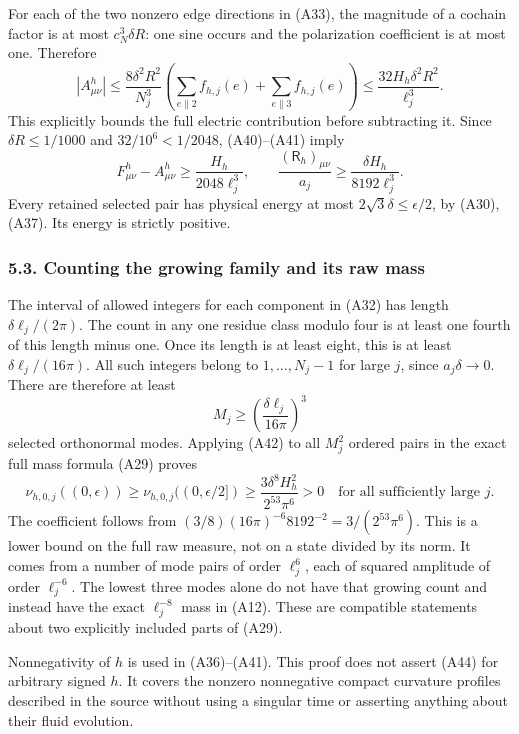 \documentclass[
  11pt,
]{article}
\begin{document}
For each of the two nonzero edge directions in (A33), the magnitude of a
cochain factor is at most \(c_N^3\delta R\): one sine occurs and the
polarization coefficient is at most one. Therefore \[
 |A^h_{\mu\nu}|
 \le\frac{8\delta^2R^2}{N_j^3}
          \left(\sum_{e\parallel2}f_{h,j}(e)
                     +\sum_{e\parallel3}f_{h,j}(e)\right)
 \le\frac{32H_h\delta^2R^2}{\ell_j^3}.
\tag{A41}
\] This explicitly bounds the full electric contribution before
subtracting it. Since \(\delta R\le1/1000\) and \(32/10^6<1/2048\),
(A40)--(A41) imply \[
 F^h_{\mu\nu}-A^h_{\mu\nu}
 \ge\frac{H_h}{2048\ell_j^3},\qquad
 \frac{(\mathsf R_h)_{\mu\nu}}{a_j}
 \ge\frac{\delta H_h}{8192\ell_j^3}.
\tag{A42}
\] Every retained selected pair has physical energy at most
\(2\sqrt3\delta\le\epsilon/2\), by (A30), (A37). Its energy is strictly
positive.

\subsubsection{5.3. Counting the growing family and its raw
mass}\label{weak-coupling-part-10-counting-the-growing-family-and-its-raw-mass}

The interval of allowed integers for each component in (A32) has length
\(\delta\ell_j/(2\pi)\). The count in any one residue class modulo four
is at least one fourth of this length minus one. Once its length is at
least eight, this is at least \(\delta\ell_j/(16\pi)\). All such
integers belong to \(1,\ldots,N_j-1\) for large \(j\), since
\(a_j\delta\to0\). There are therefore at least \[
 M_j\ge\left(\frac{\delta\ell_j}{16\pi}\right)^3
\tag{A43}
\] selected orthonormal modes. Applying (A42) to all \(M_j^2\) ordered
pairs in the exact full mass formula (A29) proves \[
 \boxed{
 \nu_{h,0,j}((0,\epsilon))
 \ge\nu_{h,0,j}((0,\epsilon/2])
 \ge \frac{3\delta^8H_h^2}{2^{53}\pi^6}>0
 \quad\text{for all sufficiently large }j.}
\tag{A44}
\] The coefficient follows from
\((3/8)(16\pi)^{-6}8192^{-2}=3/(2^{53}\pi^6)\). This is a lower bound on
the full raw measure, not on a state divided by its norm. It comes from
a number of mode pairs of order \(\ell_j^6\), each of squared amplitude
of order \(\ell_j^{-6}\). The lowest three modes alone do not have that
growing count and instead have the exact \(\ell_j^{-8}\) mass in (A12).
These are compatible statements about two explicitly included parts of
(A29).

Nonnegativity of \(h\) is used in (A36)--(A41). This proof does not
assert (A44) for arbitrary signed \(h\). It covers the nonzero
nonnegative compact curvature profiles described in the source without
using a singular time or asserting anything about their fluid evolution.
\end{document}
